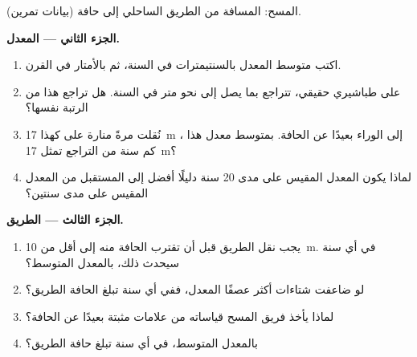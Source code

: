 \begin{problem}
\begin{omfigure}
{\small المسح: المسافة من الطريق الساحلي إلى حافة  (بيانات
تمرين).}
\label{fig:g9:landforms:survey}
\end{omfigure}

\noindent\textbf{الجزء الثاني --- المعدل.}\par\nopagebreak
\begin{enumerate}[resume, beginpenalty=10000]
  \item اكتب متوسط المعدل بالسنتيمترات في السنة، ثم بالأمتار في
        القرن.
  \item على  طباشيري حقيقي، تتراجع  بما يصل إلى نحو متر في
        السنة. هل تراجع هذا  من الرتبة نفسها؟
  \item نُقلت مرةً منارة على  كهذا \qty{17}{m} إلى الوراء بعيدًا عن
        الحافة. بمتوسط معدل هذا ، كم سنة من التراجع تمثل
        \qty{17}{m}؟
  \item لماذا يكون المعدل المقيس على مدى 20 سنة دليلًا أفضل إلى المستقبل
        من المعدل المقيس على مدى سنتين؟
\end{enumerate}

\noindent\textbf{الجزء الثالث --- الطريق.}\par\nopagebreak
\begin{enumerate}[resume, beginpenalty=10000]
  \item يجب نقل الطريق قبل أن تقترب الحافة منه إلى أقل من \qty{10}{m}.
        في أي سنة سيحدث ذلك، بالمعدل المتوسط؟
  \item لو ضاعفت شتاءات أكثر عصفًا المعدل، ففي أي سنة تبلغ الحافة
        الطريق؟
  \item لماذا يأخذ فريق المسح قياساته من علامات مثبتة بعيدًا عن
        الحافة؟
  \item بالمعدل المتوسط، في أي سنة تبلغ حافة 
        الطريق؟
\end{enumerate}
\end{problem}
